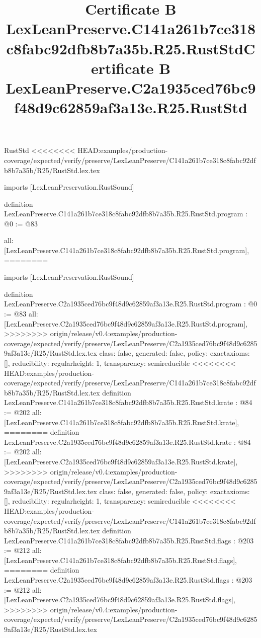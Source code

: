 \begin{lexlean}{RustStd}
<<<<<<<< HEAD:examples/production-coverage/expected/verify/preserve/LexLeanPreserve/C141a261b7ce318c8fabc92dfb8b7a35b/R25/RustStd.lex.tex
\title{Certificate B LexLeanPreserve.C141a261b7ce318c8fabc92dfb8b7a35b.R25.RustStd}
\begin{coremodule}
imports [LexLeanPreservation.RustSound]

definition LexLeanPreserve.C141a261b7ce318c8fabc92dfb8b7a35b.R25.RustStd.program : @0 := @83 {
  all: [LexLeanPreserve.C141a261b7ce318c8fabc92dfb8b7a35b.R25.RustStd.program],
========
\title{Certificate B LexLeanPreserve.C2a1935ced76bc9f48d9c62859af3a13e.R25.RustStd}
\begin{coremodule}
imports [LexLeanPreservation.RustSound]

definition LexLeanPreserve.C2a1935ced76bc9f48d9c62859af3a13e.R25.RustStd.program : @0 := @83 {
  all: [LexLeanPreserve.C2a1935ced76bc9f48d9c62859af3a13e.R25.RustStd.program],
>>>>>>>> origin/release/v0.4:examples/production-coverage/expected/verify/preserve/LexLeanPreserve/C2a1935ced76bc9f48d9c62859af3a13e/R25/RustStd.lex.tex
  class: false,
  generated: false,
  policy: exact{axioms: []},
  reducibility: regular{height: 1},
  transparency: semireducible
}
<<<<<<<< HEAD:examples/production-coverage/expected/verify/preserve/LexLeanPreserve/C141a261b7ce318c8fabc92dfb8b7a35b/R25/RustStd.lex.tex
definition LexLeanPreserve.C141a261b7ce318c8fabc92dfb8b7a35b.R25.RustStd.krate : @84 := @202 {
  all: [LexLeanPreserve.C141a261b7ce318c8fabc92dfb8b7a35b.R25.RustStd.krate],
========
definition LexLeanPreserve.C2a1935ced76bc9f48d9c62859af3a13e.R25.RustStd.krate : @84 := @202 {
  all: [LexLeanPreserve.C2a1935ced76bc9f48d9c62859af3a13e.R25.RustStd.krate],
>>>>>>>> origin/release/v0.4:examples/production-coverage/expected/verify/preserve/LexLeanPreserve/C2a1935ced76bc9f48d9c62859af3a13e/R25/RustStd.lex.tex
  class: false,
  generated: false,
  policy: exact{axioms: []},
  reducibility: regular{height: 1},
  transparency: semireducible
}
<<<<<<<< HEAD:examples/production-coverage/expected/verify/preserve/LexLeanPreserve/C141a261b7ce318c8fabc92dfb8b7a35b/R25/RustStd.lex.tex
definition LexLeanPreserve.C141a261b7ce318c8fabc92dfb8b7a35b.R25.RustStd.flags : @203 := @212 {
  all: [LexLeanPreserve.C141a261b7ce318c8fabc92dfb8b7a35b.R25.RustStd.flags],
========
definition LexLeanPreserve.C2a1935ced76bc9f48d9c62859af3a13e.R25.RustStd.flags : @203 := @212 {
  all: [LexLeanPreserve.C2a1935ced76bc9f48d9c62859af3a13e.R25.RustStd.flags],
>>>>>>>> origin/release/v0.4:examples/production-coverage/expected/verify/preserve/LexLeanPreserve/C2a1935ced76bc9f48d9c62859af3a13e/R25/RustStd.lex.tex
}}}
\end{coremodule}}
\end{coremodule}
\end{lexlean}
